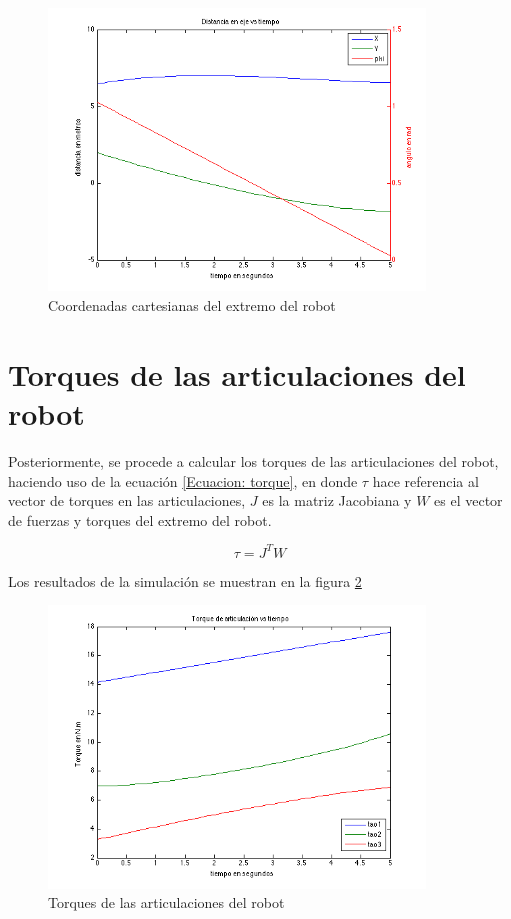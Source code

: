 \documentclass[11pt]{report} %
\begin{document}
	\begin{figure}[H]
		\centering
		\includegraphics[width=10cm]{Imagenes/distancia.png}
		\caption{Coordenadas cartesianas del extremo del robot}
		\label{Figura: extremo}
	\end{figure}

	\section{Torques de las articulaciones del robot}

	Posteriormente, se procede a calcular los torques de las articulaciones del robot, haciendo uso de la ecuación \ref{Ecuacion: torque}, en donde $\tau$ hace referencia al vector de torques en las articulaciones, $J$ es la matriz Jacobiana y $W$ es el vector de fuerzas y torques del extremo del robot.

	\begin{equation}
		\tau = {J}^{T}W
		\label{Ecuacion: torque}
	\end{equation}

	Los resultados de la simulación se muestran en la figura \ref{Figura: torque}

	\begin{figure}[H]
		\centering
		\includegraphics[width=10cm]{Imagenes/torque.png}
		\caption{Torques de las articulaciones del robot}
		\label{Figura: torque}
	\end{figure}
\end{document}
